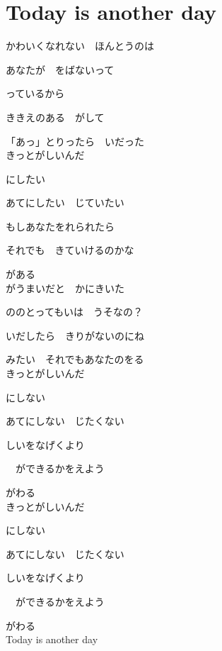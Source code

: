 \section{ Today is another day}
\large{

かわいくなれない　ほんとうのは

あなたが　をばないって

っているから

ききえのある　がして

「あっ」とりったら　いだった
\\

きっとがしいんだ

にしたい

あてにしたい　じていたい

もしあなたをれられたら

それでも　きていけるのかな

がある
\\

がうまいだと　かにきいた

ののとってもいは　うそなの？

いだしたら　きりがないのにね

みたい　それでもあなたのをる
\\

きっとがしいんだ

にしない

あてにしない　じたくない

しいをなげくより

　ができるかをえよう

がわる
\\

きっとがしいんだ

にしない

あてにしない　じたくない

しいをなげくより

　ができるかをえよう

がわる
\\

Today is another day

}